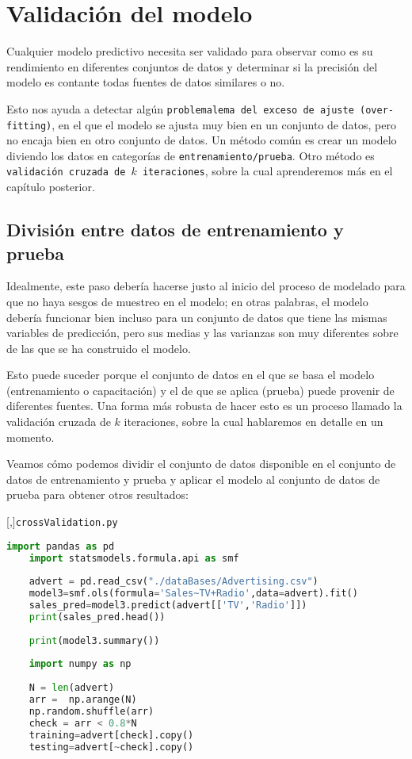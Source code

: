 \section{Validación del modelo}

Cualquier modelo predictivo necesita ser validado para observar como es su rendimiento en diferentes conjuntos de datos  y determinar si la precisión del modelo es contante todas fuentes de datos similares o no.


Esto nos ayuda a detectar algún \texttt{problemalema del exceso de ajuste (over-fitting)}, en el que el modelo se ajusta
muy bien en un conjunto de datos, pero no encaja bien en otro conjunto de datos. Un método común es crear un modelo diviendo los datos en categorías de \texttt{entrenamiento/prueba}. Otro método es
\texttt{validación cruzada de $k$ iteraciones}, sobre la cual aprenderemos más en el capítulo posterior.

\subsection{División entre datos de entrenamiento y prueba}

Idealmente, este paso debería hacerse justo al inicio del proceso de modelado para que
no haya sesgos de muestreo en el modelo; en otras palabras, el modelo debería funcionar
bien incluso para un conjunto de datos que tiene las mismas variables de predicción, pero sus medias y
las varianzas son muy diferentes sobre de las que se ha construido el modelo.


Esto puede
suceder porque el conjunto de datos en el que se basa el modelo (entrenamiento o capacitación) y el de
que se aplica (prueba) puede provenir de diferentes fuentes. Una forma más robusta de
hacer esto es un proceso llamado la validación cruzada de $k$ iteraciones, sobre la cual hablaremos en
detalle en un momento.


Veamos cómo podemos dividir el conjunto de datos disponible en el conjunto de datos de entrenamiento y prueba
y aplicar el modelo al conjunto de datos de prueba para obtener otros resultados:

[,]{\texttt{crossValidation.py}}
\begin{lstlisting}[language=Python]
	import pandas as pd
	import statsmodels.formula.api as smf
	
	advert = pd.read_csv("./dataBases/Advertising.csv")
	model3=smf.ols(formula='Sales~TV+Radio',data=advert).fit()
	sales_pred=model3.predict(advert[['TV','Radio']])
	print(sales_pred.head())
	
	print(model3.summary())
	
	import numpy as np
	
	N = len(advert)
	arr =  np.arange(N)
	np.random.shuffle(arr)
	check = arr < 0.8*N
	training=advert[check].copy()
	testing=advert[~check].copy()
\end{lstlisting}


